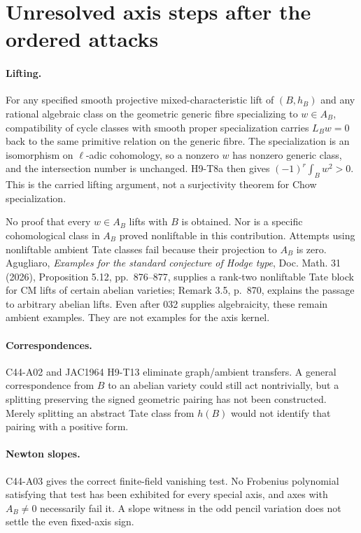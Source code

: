 \documentclass[11pt]{article}
\theoremstyle{remark}\newtheorem{remark}[theorem]{Remark}
\begin{document}
\section{Unresolved axis steps after the ordered attacks}

\paragraph{Lifting.}
For any specified smooth projective mixed-characteristic lift
of $(B,h_B)$ and any rational algebraic class on the geometric
generic fibre specializing to $w\in A_B$, compatibility of
cycle classes with smooth proper specialization carries
$L_Bw=0$ back to the same primitive relation on the generic
fibre. The specialization is an isomorphism on $\ell$-adic
cohomology, so a nonzero $w$ has nonzero generic class, and the
intersection number is unchanged. H9-T8a then gives
$(-1)^r\int_Bw^2>0$. This is the carried lifting argument,
not a surjectivity theorem for Chow specialization.

No proof that every $w\in A_B$ lifts with $B$ is obtained.
Nor is a specific cohomological class in $A_B$ proved
nonliftable in this contribution. Attempts using nonliftable
ambient Tate classes fail because their projection to $A_B$
is zero. Agugliaro, \emph{Examples for the standard conjecture
of Hodge type}, Doc. Math. 31 (2026), Proposition 5.12,
pp.~876--877, supplies a rank-two nonliftable Tate block for
CM lifts of certain abelian varieties; Remark 3.5, p.~870,
explains the passage to arbitrary abelian lifts. Even after
032 supplies algebraicity, these remain ambient examples.
They are not examples for the axis kernel.

\paragraph{Correspondences.}
C44-A02 and JAC1964 H9-T13 eliminate graph/ambient transfers.
A general correspondence from $B$ to an abelian variety could
still act nontrivially, but a splitting preserving the signed
geometric pairing has not been constructed. Merely splitting
an abstract Tate class from $h(B)$ would not identify that
pairing with a positive form.

\paragraph{Newton slopes.}
C44-A03 gives the correct finite-field vanishing test.
No Frobenius polynomial satisfying that test has been exhibited
for every special axis, and axes with $A_B\ne0$ necessarily
fail it. A slope witness in the odd pencil variation does not
settle the even fixed-axis sign.
\end{document}
